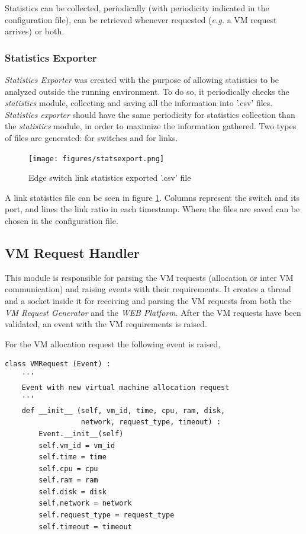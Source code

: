 \documentclass[12pt,english,oneside]{book}
\begin{document}
Statistics can be collected, periodically (with periodicity indicated in the configuration file), can be retrieved whenever requested (\textit{e.g.} a VM request arrives) or both.

\subsubsection{Statistics Exporter}
\hspace{0.6cm}

\textit{Statistics Exporter} was created with the purpose of allowing statistics to be analyzed outside the running environment.
To do so, it periodically checks the \textit{statistics} module, collecting and saving all the information into '.csv' files.
\textit{Statistics exporter} should have the same periodicity for statistics collection than the \textit{statistics} module, in order to maximize the information gathered.
Two types of files are generated: for switches and for links.

\begin{figure}[h!tbp]
        \centering
        \texttt{[image: figures/statsexport.png]}
        \caption{Edge switch link statistics exported '.csv' file}
        \label{fig:statsexport}
\end{figure}

A link statistics file can be seen in figure \ref{fig:statsexport}. Columns represent the switch and its port, and lines the link ratio in each timestamp.
Where the files are saved can be chosen in the configuration file.

\subsection{VM Request Handler}
\hspace{0.6cm}

This module is responsible for parsing the VM requests (allocation or inter VM communication) and raising events with their requirements.
It creates a thread and a socket inside it for receiving and parsing the VM requests from both the \textit{VM Request Generator} and the \textit{WEB Platform}.
After the VM requests have been validated, an event with the VM requirements is raised.

For the VM allocation request the following event is raised,

\begin{verbatim}
class VMRequest (Event) :
    '''
    Event with new virtual machine allocation request
    '''
    def __init__ (self, vm_id, time, cpu, ram, disk, 
                  network, request_type, timeout) :
        Event.__init__(self)
        self.vm_id = vm_id
        self.time = time
        self.cpu = cpu
        self.ram = ram
        self.disk = disk
        self.network = network
        self.request_type = request_type
        self.timeout = timeout
\end{verbatim}
\end{document}
